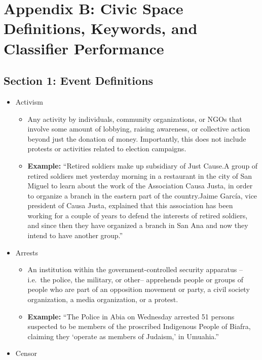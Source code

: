 \documentclass[
  letterpaper,
  DIV=11,
  numbers=noendperiod]{scrartcl}
\providecommand{\tightlist}{%
  \setlength{\itemsep}{0pt}\setlength{\parskip}{0pt}}\usepackage{longtable,booktabs,array}
\begin{document}
\section{Appendix B: Civic Space Definitions, Keywords, and Classifier
Performance}\label{appendix-b-civic-space-definitions-keywords-and-classifier-performance}

\subsection{Section 1: Event
Definitions}\label{section-1-event-definitions}

\begin{itemize}
\item
  Activism

  \begin{itemize}
  \tightlist
  \item
    Any activity by individuals, community organizations, or NGOs that
    involve some amount of lobbying, raising awareness, or collective
    action beyond just the donation of money. Importantly, this does not
    include protests or activities related to election campaigns.
  \item
    \textbf{Example:} ``Retired soldiers make up subsidiary of Just
    Cause.A group of retired soldiers met yesterday morning in a
    restaurant in the city of San Miguel to learn about the work of the
    Association Causa Justa, in order to organize a branch in the
    eastern part of the country.Jaime García, vice president of Causa
    Justa, explained that this association has been working for a couple
    of years to defend the interests of retired soldiers, and since then
    they have organized a branch in San Ana and now they intend to have
    another group.''
  \end{itemize}
\item
  Arrests

  \begin{itemize}
  \tightlist
  \item
    An institution within the government-controlled security apparatus
    --i.e.~the police, the military, or other-- apprehends people or
    groups of people who are part of an opposition movement or party, a
    civil society organization, a media organization, or a protest.
  \item
    \textbf{Example:} ``The Police in Abia on Wednesday arrested 51
    persons suspected to be members of the proscribed Indigenous People
    of Biafra, claiming they `operate as members of Judaism,' in
    Umuahia.''
  \end{itemize}
\item
  Censor


\end{itemize}
\end{document}

